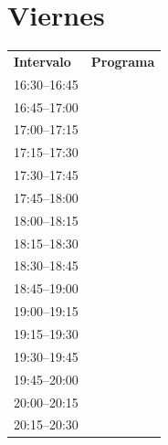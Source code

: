 \documentclass[11pt,a4paper]{article}
\begin{document}
\section*{Viernes}
\begin{center}
\begin{adjustbox}{max totalsize={\textwidth}{0.82\textheight},center}
\begin{tabular}{|p{3.6cm}|p{11cm}|}
\hline
\textbf{Intervalo} & \textbf{Programa} \\
\cline{1-1}
{\centering\rule{0pt}{2.80ex}16:30--16:45} & {\centering\rule{0pt}{2.80ex}} \\
\cline{1-1}
{\centering\rule{0pt}{2.80ex}16:45--17:00} & {\centering\rule{0pt}{2.80ex}} \\
\cline{1-1}
{\centering\rule{0pt}{2.80ex}17:00--17:15} & {\centering\rule{0pt}{2.80ex}} \\
\cline{1-1}
{\centering\rule{0pt}{2.80ex}17:15--17:30} & {\centering\rule{0pt}{2.80ex}} \\
\cline{1-1}
{\centering\rule{0pt}{2.80ex}17:30--17:45} & {\centering\rule{0pt}{2.80ex}} \\
\cline{1-1}
{\centering\rule{0pt}{2.80ex}17:45--18:00} & {\centering\rule{0pt}{2.80ex}} \\
\cline{1-1}
{\centering\rule{0pt}{2.80ex}18:00--18:15} & {\centering\rule{0pt}{2.80ex}} \\
\cline{1-1}
{\centering\rule{0pt}{2.80ex}18:15--18:30} & {\centering\rule{0pt}{2.80ex}} \\
\cline{1-1}
{\centering\rule{0pt}{2.80ex}18:30--18:45} & {\centering\rule{0pt}{2.80ex}} \\
\cline{1-1}
{\centering\rule{0pt}{2.80ex}18:45--19:00} & {\centering\rule{0pt}{2.80ex}} \\
\cline{1-1}
{\centering\rule{0pt}{2.80ex}19:00--19:15} & {\centering\rule{0pt}{2.80ex}} \\
\cline{1-1}
{\centering\rule{0pt}{2.80ex}19:15--19:30} & {\centering\rule{0pt}{2.80ex}} \\
\cline{1-1}
{\centering\rule{0pt}{2.80ex}19:30--19:45} & {\centering\rule{0pt}{2.80ex}} \\
\cline{1-1}
{\centering\rule{0pt}{2.80ex}19:45--20:00} & {\centering\rule{0pt}{2.80ex}} \\
\cline{1-1}
{\centering\rule{0pt}{2.80ex}20:00--20:15} & {\centering\rule{0pt}{2.80ex}} \\
\cline{1-1}
{\centering\rule{0pt}{2.80ex}20:15--20:30} & {\centering\rule{0pt}{2.80ex}} \\

\end{tabular}
\end{adjustbox}
\end{center}
\end{document}
